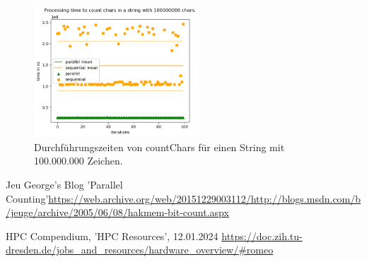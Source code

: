 \documentclass[plainarticle,zihtitle,german,final,hyperref,utf8]{zihpub}
\begin{document}
\begin{figure}[h]
	\begin{center}
		\includegraphics[width=0.55\textwidth]{images/comp_count_100000000.png}
		\caption{Durchführungszeiten von countChars für einen String mit 100.000.000 Zeichen.}
		\label{fig:count_comp_100M}
	\end{center}
\end{figure}

\newpage
\begin{thebibliography}{9}
	Jeu George's Blog 'Parallel Counting'\newline \url{https://web.archive.org/web/20151229003112/http://blogs.msdn.com/b/jeuge/archive/2005/06/08/hakmem-bit-count.aspx}
	
	HPC Compendium, 'HPC Resources', 12.01.2024
	\url{https://doc.zih.tu-dresden.de/jobs_and_resources/hardware_overview/#romeo}
\end{thebibliography}
\end{document}
